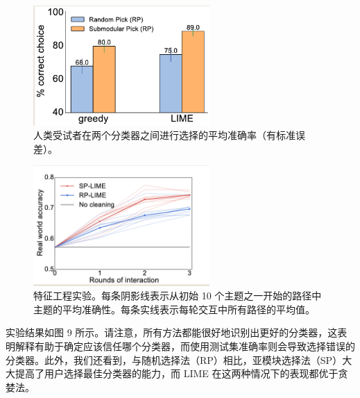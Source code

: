 \documentclass[12pt, a4paper]{ctexart} %
\begin{document}
\begin{figure}[h]
    \centering
    \includegraphics[width=0.6\textwidth]{img/img_9.png}
    \caption{人类受试者在两个分类器之间进行选择的平均准确率（有标准误差）。}
    \label{fig:img_9}
\end{figure}
\begin{figure}[h]
    \centering
    \includegraphics[width=0.6\textwidth]{img/img_10.png}
    \caption{特征工程实验。每条阴影线表示从初始 10 个主题之一开始的路径中主题的平均准确性。每条实线表示每轮交互中所有路径的平均值。}
    \label{fig:img_10}
\end{figure}
实验结果如图 9 所示。请注意，所有方法都能很好地识别出更好的分类器，这表明解释有助于确定应该信任哪个分类器，而使用测试集准确率则会导致选择错误的分类器。此外，我们还看到，与随机选择法（RP）相比，亚模块选择法（SP）大大提高了用户选择最佳分类器的能力，而 LIME 在这两种情况下的表现都优于贪婪法。
\end{document}
